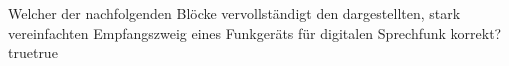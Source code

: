     {Welcher der nachfolgenden Blöcke vervollständigt den dargestellten, stark vereinfachten Empfangszweig eines Funkgeräts für digitalen Sprechfunk korrekt?}
    {}
    {}
    {}
    {}
    {true}{true}